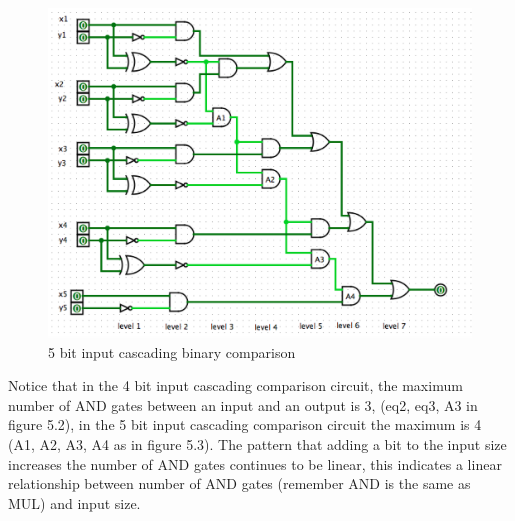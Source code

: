 \documentclass[12pt,twoside]{reedthesis}
\begin{document}
   \begin{figure}[h]
	   
	       \centering
	   \includegraphics[scale = .5]{comp2_5}
	     \caption{5 bit input cascading binary comparison}
	 \label{subd}
	\end{figure}
	
 \par Notice that in the 4 bit input cascading comparison circuit, the maximum number of AND gates between an input and an output is 3, (eq2, eq3, A3 in figure 5.2), in the 5 bit input cascading comparison circuit the maximum is 4 (A1, A2, A3, A4 as in figure 5.3). The pattern that adding a bit to the input size increases the number of AND gates continues to be linear, this indicates a linear relationship between number of AND gates (remember AND is the same as MUL) and input size. 
 
\end{document}
